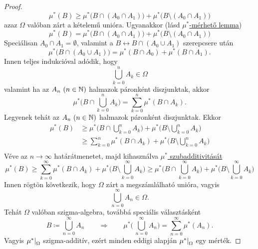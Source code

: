 \documentclass[
]{elteikthesis}[2024/04/26]
\begin{document}
\begin{proof}
		\[
			\mu^*(B) \geq 
			\mu^* \bigl( B \cap (A_0 \cap A_1) \bigr) + 
			\mu^* \bigl( B \setminus (A_0 \cap A_1) \bigr)
		\]
		azaz \( \Omega \) valóban zárt a kételemű unióra. 
		Ugyanakkor (lásd \hyperref[lem:mu-csillag-merheto]{\( \mu^*\)-mérhető lemma})
		\[
			\mu^*(B) = 
			\mu^* \bigl( B \cap (A_0 \cap A_1) \bigr) + 
			\mu^* \bigl( B \setminus (A_0 \cap A_1) \bigr)
		\]
		Speciálisan \( A_0 \cap A_1 = \emptyset \), 
		valamint a \( B \leftrightarrow B \cap (A_0 \cup A_1) \) szerepcsere után
		\[
			\mu^* \bigl( B \cap (A_0 \cup A_1) \bigr) =
			\mu^*( B \cap A_0 ) + \mu^*( B \cap A_1 ).
		\]
		Innen teljes indukcióval adódik, hogy
		\[
			\bigcup_{k=0}^n A_k \in \Omega
		\]
		valamint ha az \( A_n \ (n \in \mathbb{N}) \) halmazok páronként diszjunktak, akkor
		\[
			\mu^* \Biggl( B \cap \bigcup_{k=0}^n A_k \Biggr) = 
			\sum_{k=0}^{n} \mu^*(B \cap A_k).
		\]
		Legyenek tehát az \( A_n \ (n \in \mathbb{N}) \) halmazok páronként diszjunktak. Ekkor
		\begin{align*}
			\mu^*(B)
			&\geq \mu^* \Biggl( B \cap      \bigcup_{k=0}^n A_k \Biggr) +
			      \mu^* \Biggl( B \setminus \bigcup_{k=0}^n A_k \Biggr) \\[3pt]
			&\geq \sum_{k=0}^{n} \mu^*(B \cap A_k) +
			      \mu^* \Biggl( B \setminus \bigcup_{k=0}^n A_k \Biggr) \\
		\end{align*}
		Véve az \( n \to \infty \) határátmenetet, 
		majd kihasználva \hyperref[eq:mu-csillag-szubadditív]{\( \mu^* \) szubadditivitását} 
		\[
			\mu^*(B) \geq
			\sum_{k=0}^{\infty} \mu^*(B \cap A_k) +
			\mu^* \Biggl( B \setminus \bigcup_{k=0}^{\infty} A_k \Biggr) \geq
			\mu^* \Biggl( B \cap \bigcup_{k=0}^{\infty} A_k \Biggr) +
			\mu^* \Biggl( B \setminus \bigcup_{k=0}^{\infty} A_k \Biggr)
		\]
		Innen rögtön következik, hogy \( \Omega \) zárt a megszámlálható unióra, vagyis
		\[
			\bigcup_{n=0}^{\infty} A_n \in \Omega.
		\]
		Tehát \( \Omega \) valóban szigma-algebra, továbbá speciális választásként
		\[
			B \coloneq \bigcup_{n=0}^{\infty} A_n
			\qquad \Longrightarrow \qquad
			\mu^* \Biggl( \,\bigcup_{n=0}^{\infty} A_n \Biggr) =
			\sum_{n=0}^{\infty} \mu^*( A_n ).
		\]
		Vagyis \( \restr{\mu^*}{\Omega} \) szigma-additív, 
		ezért minden eddigi alapján \( \restr{\mu^*}{\Omega} \) egy mérték.
	\end{proof}
	
\end{document}
